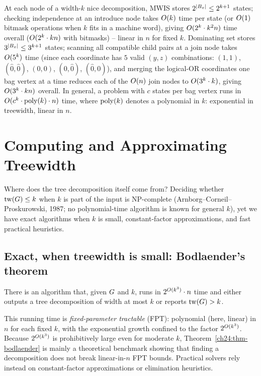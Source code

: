 \begin{complexitybox}
At each node of a width-$k$ nice decomposition, MWIS stores $2^{\lvert B_x\rvert}\le
2^{k+1}$ states; checking independence at an introduce node takes $O(k)$ time per
state (or $O(1)$ bitmask operations when $k$ fits in a machine word), giving
$O(2^k\cdot k^2 n)$ time overall ($O(2^k\cdot kn)$ with bitmasks) -- linear in
$n$ for fixed $k$. Dominating set stores $3^{\lvert B_x\rvert}\le 3^{k+1}$ states;
scanning all compatible child pairs at a join node takes $O(5^k)$ time (since
each coordinate has $5$ valid $(y,z)$ combinations: $(1,1)$, $(\hat 0,\hat 0)$,
$(0,0)$, $(0,\hat 0)$, $(\hat 0,0)$), and merging the logical-OR coordinates one
bag vertex at a time reduces each of the $O(n)$ join nodes to $O(3^k\cdot k)$,
giving $O(3^k\cdot kn)$ overall. In general, a problem with $c$ states per bag
vertex runs in $O(c^k\cdot\operatorname{poly}(k)\cdot n)$ time, where $\operatorname{poly}(k)$ denotes a
polynomial in $k$: exponential in treewidth, linear in $n$.
\end{complexitybox}

\section{Computing and Approximating Treewidth}
\label{ch24:compute}

Where does the tree decomposition itself come from? Deciding whether
$\operatorname{tw}(G)\le k$ when $k$ is part of the input is NP-complete
(Arnborg--Corneil--Proskurowski, 1987; no polynomial-time algorithm is known for
general $k$), yet we have exact algorithms when $k$ is small, constant-factor
approximations, and fast practical heuristics.

\subsection{Exact, when treewidth is small: Bodlaender's theorem}

\begin{theorem}[Bodlaender, 1996]
\label{ch24:thm-bodlaender}
There is an algorithm that, given $G$ and $k$, runs in $2^{O(k^3)}\cdot n$
time and either outputs a tree decomposition of width at most $k$ or reports
$\operatorname{tw}(G)>k$.
\end{theorem}

This running time is \emph{fixed-parameter tractable} (FPT): polynomial (here,
linear) in $n$ for each fixed $k$, with the exponential growth confined to the
factor $2^{O(k^3)}$. Because $2^{O(k^3)}$ is prohibitively large even for
moderate $k$, Theorem~\ref{ch24:thm-bodlaender} is mainly a theoretical benchmark
showing that finding a decomposition does not break linear-in-$n$ FPT bounds.
Practical solvers rely instead on constant-factor approximations or elimination
heuristics.

